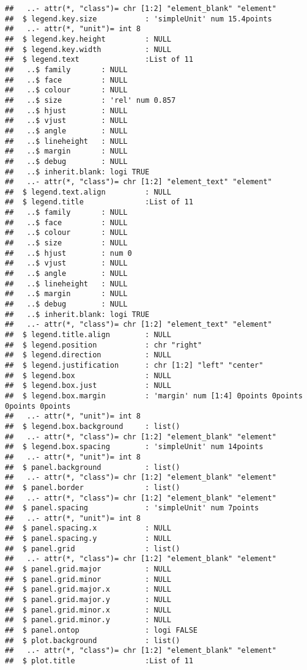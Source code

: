 \documentclass[
]{article}
\begin{document}
\begin{verbatim}
##   ..- attr(*, "class")= chr [1:2] "element_blank" "element"
##  $ legend.key.size           : 'simpleUnit' num 15.4points
##   ..- attr(*, "unit")= int 8
##  $ legend.key.height         : NULL
##  $ legend.key.width          : NULL
##  $ legend.text               :List of 11
##   ..$ family       : NULL
##   ..$ face         : NULL
##   ..$ colour       : NULL
##   ..$ size         : 'rel' num 0.857
##   ..$ hjust        : NULL
##   ..$ vjust        : NULL
##   ..$ angle        : NULL
##   ..$ lineheight   : NULL
##   ..$ margin       : NULL
##   ..$ debug        : NULL
##   ..$ inherit.blank: logi TRUE
##   ..- attr(*, "class")= chr [1:2] "element_text" "element"
##  $ legend.text.align         : NULL
##  $ legend.title              :List of 11
##   ..$ family       : NULL
##   ..$ face         : NULL
##   ..$ colour       : NULL
##   ..$ size         : NULL
##   ..$ hjust        : num 0
##   ..$ vjust        : NULL
##   ..$ angle        : NULL
##   ..$ lineheight   : NULL
##   ..$ margin       : NULL
##   ..$ debug        : NULL
##   ..$ inherit.blank: logi TRUE
##   ..- attr(*, "class")= chr [1:2] "element_text" "element"
##  $ legend.title.align        : NULL
##  $ legend.position           : chr "right"
##  $ legend.direction          : NULL
##  $ legend.justification      : chr [1:2] "left" "center"
##  $ legend.box                : NULL
##  $ legend.box.just           : NULL
##  $ legend.box.margin         : 'margin' num [1:4] 0points 0points 0points 0points
##   ..- attr(*, "unit")= int 8
##  $ legend.box.background     : list()
##   ..- attr(*, "class")= chr [1:2] "element_blank" "element"
##  $ legend.box.spacing        : 'simpleUnit' num 14points
##   ..- attr(*, "unit")= int 8
##  $ panel.background          : list()
##   ..- attr(*, "class")= chr [1:2] "element_blank" "element"
##  $ panel.border              : list()
##   ..- attr(*, "class")= chr [1:2] "element_blank" "element"
##  $ panel.spacing             : 'simpleUnit' num 7points
##   ..- attr(*, "unit")= int 8
##  $ panel.spacing.x           : NULL
##  $ panel.spacing.y           : NULL
##  $ panel.grid                : list()
##   ..- attr(*, "class")= chr [1:2] "element_blank" "element"
##  $ panel.grid.major          : NULL
##  $ panel.grid.minor          : NULL
##  $ panel.grid.major.x        : NULL
##  $ panel.grid.major.y        : NULL
##  $ panel.grid.minor.x        : NULL
##  $ panel.grid.minor.y        : NULL
##  $ panel.ontop               : logi FALSE
##  $ plot.background           : list()
##   ..- attr(*, "class")= chr [1:2] "element_blank" "element"
##  $ plot.title                :List of 11

\end{verbatim}
\end{document}
